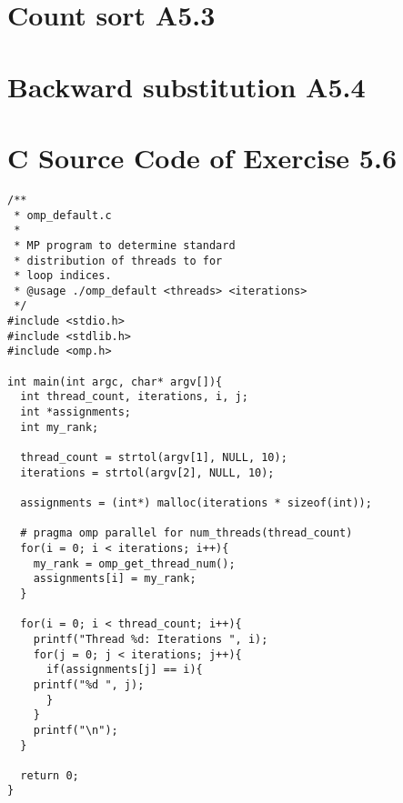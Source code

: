 \documentclass[a4paper,11pt,twoside]{article}
\begin{document}
\section{Count sort A5.3}

\section{Backward substitution A5.4}

\appendix

\section{C Source Code of Exercise 5.6}{\label{app:default}}
\begin{verbatim}
/**
 * omp_default.c
 * 
 * MP program to determine standard 
 * distribution of threads to for
 * loop indices.
 * @usage ./omp_default <threads> <iterations> 
 */
#include <stdio.h>
#include <stdlib.h>
#include <omp.h>

int main(int argc, char* argv[]){
  int thread_count, iterations, i, j;
  int *assignments;
  int my_rank;

  thread_count = strtol(argv[1], NULL, 10);
  iterations = strtol(argv[2], NULL, 10);

  assignments = (int*) malloc(iterations * sizeof(int));

  # pragma omp parallel for num_threads(thread_count)
  for(i = 0; i < iterations; i++){
    my_rank = omp_get_thread_num();
    assignments[i] = my_rank;
  }

  for(i = 0; i < thread_count; i++){
    printf("Thread %d: Iterations ", i);
    for(j = 0; j < iterations; j++){
      if(assignments[j] == i){
	printf("%d ", j);
      }
    }
    printf("\n");
  }

  return 0;
}

\end{verbatim}



\end{document}
